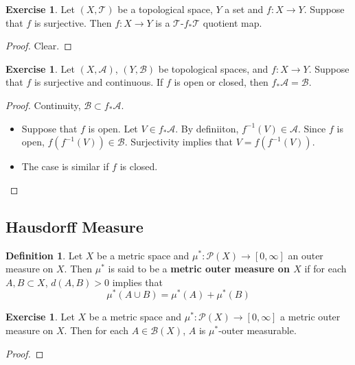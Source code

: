 \documentclass[12pt]{amsart}
\theoremstyle{definition}
\newtheorem{defn}[definition]{Definition}
\newtheorem{ex}[definition]{Exercise}
\newcommand{\MA}{\mathcal{A}}
\newcommand{\MB}{\mathcal{B}}
\newcommand{\MP}{\mathcal{P}}
\newcommand{\MT}{\mathcal{T}}
\newcommand{\lex}[1]{\label{ex:#1}}
\begin{document}
	\begin{ex} \lex{34007}
	Let $(X, \MT)$ be a topological space, $Y$ a set and $f:X \rightarrow Y$. Suppose that $f$ is surjective. Then $f: X \rightarrow Y$ is a $\MT$-$f_*\MT$ quotient map. 
	\end{ex}
	
	\begin{proof}
	Clear.
	\end{proof}
	
	\begin{ex} \lex{34008}
	Let $(X, \MA)$, $(Y, \MB)$ be topological spaces, and $f:X \rightarrow Y$. Suppose that $f$ is surjective and continuous. If $f$ is open or closed, then $f_*\MA = \MB$.
	\end{ex}
	
	\begin{proof}
	Continuity, $\MB \subset f_*\MA$. 
	\begin{itemize}
	\item Suppose that $f$ is open. Let $V \in f_*\MA$. By definiiton, $f^{-1}(V) \in \MA$. Since $f$ is open, $f(f^{-1}(V)) \in \MB$. Surjectivity implies that $V = f(f^{-1}(V))$. 
	\item The case is similar if $f$ is closed.
	\end{itemize}
	\end{proof}
	
	\newpage
	\subsection{Hausdorff Measure}
	
	\begin{defn}
	Let $X$ be a metric space and $\mu^*: \MP(X) \rightarrow [0, \infty]$ an outer measure on $X$. Then $\mu^*$ is said to be a \textbf{metric outer measure on $X$} if for each $A, B \subset X$, $d(A,B) > 0$ implies that 
	\begin{equation*}
	\mu^*(A \cup B) = \mu^*(A) + \mu^*(B)
	\end{equation*}
	\end{defn}	
	
	\begin{ex}
	Let $X$ be a metric space and $\mu^*: \MP(X) \rightarrow [0, \infty]$ a metric outer measure on $X$.
	Then for each $A \in \MB(X)$, $A$ is $\mu^*$-outer measurable. 
	\end{ex}
	
	\begin{proof}
	
	\end{proof}
	
\end{document}
